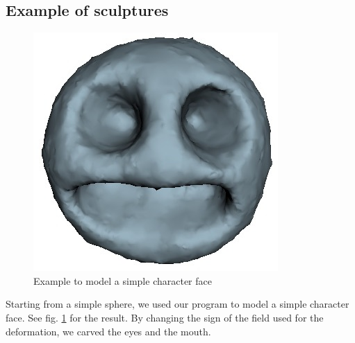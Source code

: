 \documentclass[ams]{U-AizuGT}
\begin{document}
\subsection{Example of sculptures}
\begin{figure}
  \centering\includegraphics[width=0.7\columnwidth]{simple_face_poisson-2.jpg}
  \caption{Example to model a simple character face} \label{fig:face}
\end{figure}
Starting from a simple sphere, we used our program to model a simple character face. 
See fig. \ref{fig:face} for the result.
By changing the sign of the field used for the deformation, we carved the eyes 
and the mouth.
\end{document}
